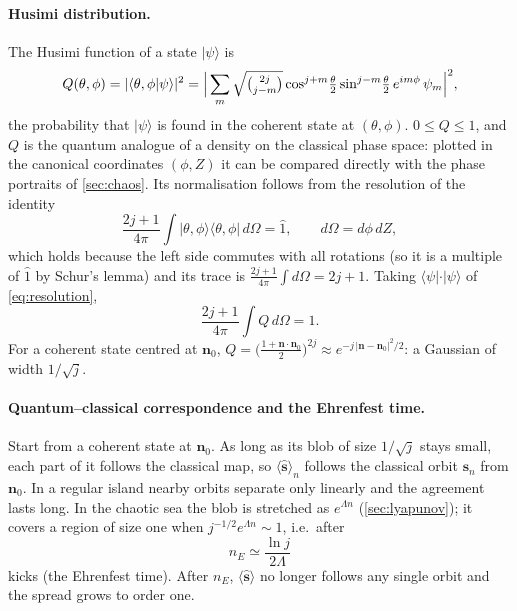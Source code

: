 \documentclass[11pt,a4paper]{article}
\begin{document}
\paragraph{Husimi distribution.} The Husimi function of a state $|\psi\rangle$ is
\begin{equation}\label{eq:husimi}
  Q(\theta,\phi) = |\langle\theta,\phi|\psi\rangle|^2
  = \Big|\sum_m \sqrt{\tbinom{2j}{j-m}}\cos^{j+m}\!\tfrac{\theta}{2}\sin^{j-m}\!\tfrac{\theta}{2}\,e^{im\phi}\,\psi_m\Big|^2 ,
\end{equation}
the probability that $|\psi\rangle$ is found in the coherent state at $(\theta,\phi)$. $0 \le Q \le 1$, and $Q$ is the
quantum analogue of a density on the classical phase space: plotted in the canonical coordinates $(\phi, Z)$ it can be
compared directly with the phase portraits of \cref{sec:chaos}. Its normalisation follows from the resolution of the
identity
\begin{equation}\label{eq:resolution}
  \frac{2j+1}{4\pi}\int |\theta,\phi\rangle\langle\theta,\phi|\,d\Omega = \hat 1, \qquad d\Omega = d\phi\,dZ ,
\end{equation}
which holds because the left side commutes with all rotations (so it is a multiple of $\hat1$ by Schur's lemma) and its
trace is $\frac{2j+1}{4\pi}\int d\Omega = 2j+1$. Taking $\langle\psi|\cdot|\psi\rangle$ of \eqref{eq:resolution},
\begin{equation}\label{eq:husimi-norm}
  \frac{2j+1}{4\pi}\int Q\,d\Omega = 1 .
\end{equation}
For a coherent state centred at $\bm n_0$, $Q = \big(\frac{1+\bm n\cdot\bm n_0}{2}\big)^{2j} \approx e^{-j\,|\bm n -
\bm n_0|^2/2}$: a Gaussian of width $1/\sqrt j$.

\paragraph{Quantum--classical correspondence and the Ehrenfest time.} Start from a coherent state at $\bm n_0$. As long
as its blob of size $1/\sqrt j$ stays small, each part of it follows the classical map, so $\langle\hat{\bm s}\rangle_n$
follows the classical orbit $\bm s_n$ from $\bm n_0$. In a regular island nearby orbits separate only linearly and the
agreement lasts long. In the chaotic sea the blob is stretched as $e^{\Lambda n}$ (\cref{sec:lyapunov}); it covers a
region of size one when $j^{-1/2}e^{\Lambda n} \sim 1$, i.e.\ after
\begin{equation}\label{eq:ehrenfest}
  n_E \simeq \frac{\ln j}{2\Lambda}
\end{equation}
kicks (the Ehrenfest time). After $n_E$, $\langle\hat{\bm s}\rangle$ no longer follows any single orbit and the spread
grows to order one.
\end{document}
